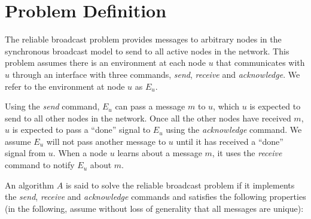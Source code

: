\documentclass[english]{article}
\begin{document}
\section{Problem Definition}

The reliable broadcast problem provides messages to arbitrary nodes in the synchronous broadcast model to send to all active nodes in the network. This problem assumes there is an environment at each node $u$ that communicates with $u$ through an  interface with three commands, \textit{send}, \textit{receive} and \textit{acknowledge}. We refer to the environment at node $u$ as $E_u$.

Using the \textit{send} command, $E_u$ can pass a message $m$ to $u$, which $u$ is expected to send to all other nodes in the network. Once all the other nodes have received $m$, $u$ is expected to pass a ``done'' signal to $E_u$ using the \textit{acknowledge} command. We assume $E_u$ will not pass another message to $u$ until it has received a ``done'' signal from $u$. 
When a node $u$ learns about a message $m$, it uses the \textit{receive} command to notify $E_u$ about $m$.

An algorithm $A$ is said to solve the reliable broadcast problem if it implements the \textit{send}, \textit{receive} and \textit{acknowledge} commands and satisfies the following properties (in the following, assume without loss of generality that all messages are unique):
\end{document}
